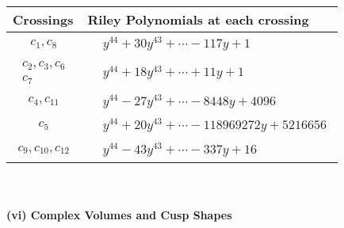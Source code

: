 \documentclass[1p]{elsarticle_modified}
\theoremstyle{definition}
\begin{document}
\begin{tabular}{m{50pt}|m{274pt}}
Crossings & \hspace{64pt}Riley Polynomials at each crossing \\
\hline $$\begin{aligned}c_{1},c_{8}\end{aligned}$$&$\begin{aligned}
&y^{44}+30 y^{43}+\cdots-117 y+1
\end{aligned}$\\
\hline $$\begin{aligned}c_{2},c_{3},c_{6}\\c_{7}\end{aligned}$$&$\begin{aligned}
&y^{44}+18 y^{43}+\cdots+11 y+1
\end{aligned}$\\
\hline $$\begin{aligned}c_{4},c_{11}\end{aligned}$$&$\begin{aligned}
&y^{44}-27 y^{43}+\cdots-8448 y+4096
\end{aligned}$\\
\hline $$\begin{aligned}c_{5}\end{aligned}$$&$\begin{aligned}
&y^{44}+20 y^{43}+\cdots-118969272 y+5216656
\end{aligned}$\\
\hline $$\begin{aligned}c_{9},c_{10},c_{12}\end{aligned}$$&$\begin{aligned}
&y^{44}-43 y^{43}+\cdots-337 y+16
\end{aligned}$\\
\hline
\end{tabular}\\~\\
\newpage\flushleft \textbf{(vi) Complex Volumes and Cusp Shapes}
\end{document}
